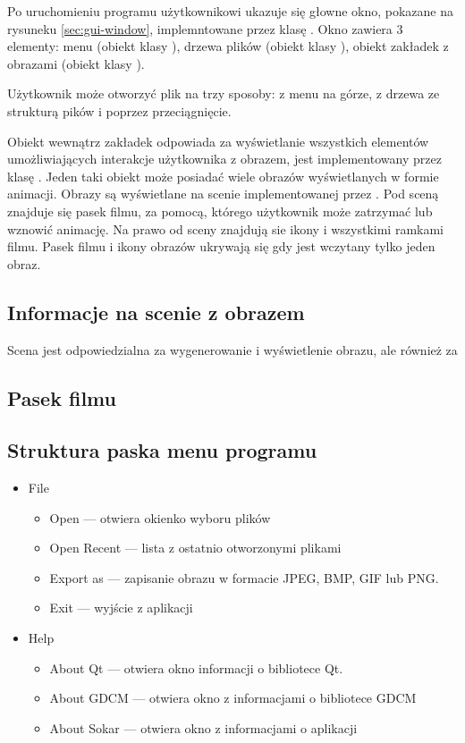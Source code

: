 
\par
Po uruchomieniu programu użytkownikowi ukazuje się głowne okno, pokazane na rysuneku \ref{sec:gui-window}, implemntowane przez klasę .
Okno zawiera 3 elementy: menu (obiekt klasy ), drzewa plików (obiekt klasy ), obiekt zakładek z obrazami (obiekt klasy ).
\par
Użytkownik może otworzyć plik \DICOM na trzy sposoby: z menu na górze, z drzewa ze strukturą pików i poprzez przeciągnięcie.
\par
Obiekt wewnątrz zakładek odpowiada za wyświetlanie wszystkich elementów umożliwiających interakcje użytkownika z obrazem, jest implementowany przez klasę .
Jeden taki obiekt może posiadać wiele obrazów wyświetlanych w formie animacji.
Obrazy są wyświetlane na scenie implementowanej przez .
Pod sceną znajduje się pasek filmu, za pomocą, którego użytkownik może zatrzymać lub wznowić animację.
Na prawo od sceny znajdują sie ikony i wszystkimi ramkami filmu.
Pasek filmu i ikony obrazów ukrywają się gdy jest wczytany tylko jeden obraz.

\subsection*{Informacje na scenie z obrazem}

Scena jest odpowiedzialna za wygenerowanie i wyświetlenie obrazu, ale również za 

\subsection*{Pasek filmu}

\subsection*{Struktura paska menu programu}
\par
\begin{itemize}
    \item File
          \begin{itemize}
              \item Open --- otwiera okienko wyboru plików
              \item Open Recent --- lista z ostatnio otworzonymi plikami
              \item Export as --- zapisanie obrazu w formacie JPEG, BMP, GIF lub PNG.
              \item Exit --- wyjście z aplikacji
          \end{itemize}
    \item Help
          \begin{itemize}
              \item About Qt --- otwiera okno informacji o bibliotece Qt.
              \item About GDCM --- otwiera okno z informacjami o bibliotece GDCM
              \item About Sokar --- otwiera okno z informacjami o aplikacji
          \end{itemize}
\end{itemize}